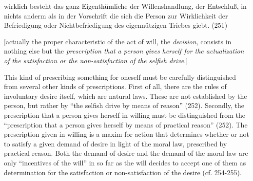 wirklich besteht das ganz Eigenth\"{u}mliche der Willenshandlung, der Entschlu\ss{}, in nichts anderm als in der Vorschrift die sich die Person zur Wirklichkeit der Befriedigung oder Nichtbefriedigung des eigenn\"{u}tzigen Triebes giebt. (251)

[actually the proper characteristic of the act of will, the \textit{decision}, consists in nothing else but the \textit{prescription that a person gives herself for the actualization of the satisfaction or the non{-}satisfaction of the selfish drive}.]

This kind of prescribing something for oneself must be carefully distinguished from several other kinds of prescriptions. First of all, there are the rules of involuntary desire itself, which are natural laws. These are not established by the person, but rather by ``the selfish drive by means of reason'' (252). Secondly, the prescription that a person gives herself in willing must be distinguished from the ``prescription that a person gives herself by means of practical reason'' (252). The prescription given in willing is a maxim for action that determines whether or not to satisfy a given demand of desire in light of the moral law, prescribed by practical reason. Both the demand of desire and the demand of the moral law are only ``incentives of the will'' in so far as the will decides to accept one of them as determination for the satisfaction or non{-}satisfaction of the desire (cf. 254{-}255). 

